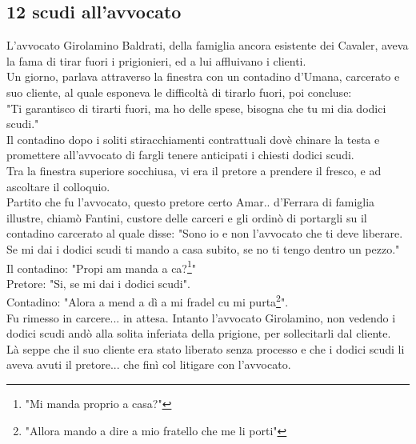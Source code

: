 \documentclass[10pt]{memoir} %
\begin{document}
\subsection{12 scudi all'avvocato}
L'avvocato Girolamino Baldrati, della famiglia ancora esistente dei Cavaler, aveva la fama di tirar fuori i prigionieri, ed a lui affluivano i clienti. \\
Un giorno, parlava attraverso la finestra con un contadino d'Umana, carcerato e suo cliente, al quale esponeva le difficoltà di tirarlo fuori, poi concluse:\\
"Ti garantisco di tirarti fuori, ma ho delle spese, bisogna che tu mi dia dodici scudi."\\
Il contadino dopo i soliti stiracchiamenti contrattuali dovè chinare la testa e promettere all'avvocato di fargli tenere anticipati i chiesti dodici scudi.\\
Tra la finestra superiore socchiusa, vi era il pretore a prendere il fresco, e ad ascoltare il colloquio.\\
Partito che fu l'avvocato, questo pretore certo Amar\:.\:. d'Ferrara di famiglia illustre, chiamò Fantini, custore delle carceri e gli ordinò di portargli su il contadino carcerato al quale disse: "Sono io e non l'avvocato che ti deve liberare. Se mi dai i dodici scudi ti mando a casa subito, se no ti tengo dentro un pezzo."\\
Il contadino: "Propi am manda a ca?\footnote{"Mi manda proprio a casa?"}"\\
Pretore: "Si, se mi dai i dodici scudi".\\
Contadino: "Alora a mend a dì a mi fradel cu mi purta\footnote{"Allora mando a dire a mio fratello che me li porti"}".\\
Fu rimesso in carcere... in attesa. Intanto l'avvocato Girolamino, non vedendo i dodici scudi andò alla solita inferiata della prigione, per sollecitarli dal cliente.\\
Là seppe che il suo cliente era stato liberato senza processo e che i dodici scudi li aveva avuti il pretore... che finì col litigare con l'avvocato.
\end{document}
